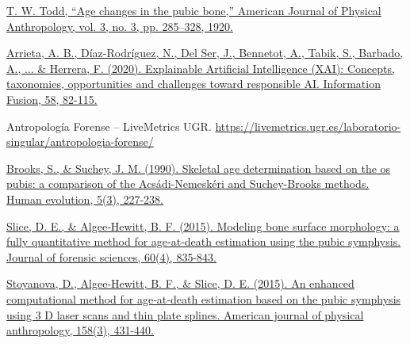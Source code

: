 
\begin{thebibliography}{9}



	\href{https://onlinelibrary.wiley.com/doi/abs/10.1002/ajpa.1330030301}{T. W. Todd, “Age changes in the pubic bone,” American Journal of Physical Anthropology, vol. 3, no. 3, pp. 285–328, 1920.}




	\href{https://www.sciencedirect.com/science/article/pii/S1566253519308103?via%3Dihub}{Arrieta, A. B., Díaz-Rodríguez, N., Del Ser, J., Bennetot, A., Tabik, S., Barbado, A., ... \& Herrera, F. (2020). Explainable Artificial Intelligence (XAI): Concepts, taxonomies, opportunities and challenges toward responsible AI. Information Fusion, 58, 82-115.}



	Antropología Forense – LiveMetrics UGR. \url{https://livemetrics.ugr.es/laboratorio-singular/antropologia-forense/}


	\href{https://link.springer.com/article/10.1007/BF02437238}{Brooks, S., \& Suchey, J. M. (1990). Skeletal age determination based on the os pubis: a comparison of the Acsádi-Nemeskéri and Suchey-Brooks methods. Human evolution, 5(3), 227-238.}


	\href{https://onlinelibrary.wiley.com/doi/full/10.1111/1556-4029.12778}{Slice, D. E., \& Algee‐Hewitt, B. F. (2015). Modeling bone surface morphology: a fully quantitative method for age‐at‐death estimation using the pubic symphysis. Journal of forensic sciences, 60(4), 835-843.}


	\href{https://onlinelibrary.wiley.com/doi/full/10.1002/ajpa.22797}{Stoyanova, D., Algee‐Hewitt, B. F., \& Slice, D. E. (2015). An enhanced computational method for age‐at‐death estimation based on the pubic symphysis using 3 D laser scans and thin plate splines. American journal of physical anthropology, 158(3), 431-440.}





\end{thebibliography}
